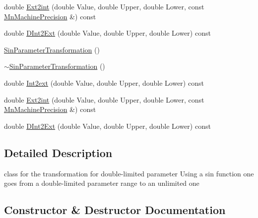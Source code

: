 \begin{DoxyCompactItemize}
\item 
double \mbox{\hyperlink{classROOT_1_1Minuit2_1_1SinParameterTransformation_a5a98af7b966742b4d3c90ab6d6bbeb5a}{Ext2int}} (double Value, double Upper, double Lower, const \mbox{\hyperlink{classROOT_1_1Minuit2_1_1MnMachinePrecision}{Mn\+Machine\+Precision}} \&) const
\item 
double \mbox{\hyperlink{classROOT_1_1Minuit2_1_1SinParameterTransformation_a4335749e9dd572c2234a8a119893e3fd}{D\+Int2\+Ext}} (double Value, double Upper, double Lower) const
\item 
\mbox{\hyperlink{classROOT_1_1Minuit2_1_1SinParameterTransformation_a54b8892f35f480210a431f1001634b9c}{Sin\+Parameter\+Transformation}} ()
\item 
\mbox{\hyperlink{classROOT_1_1Minuit2_1_1SinParameterTransformation_a5e6632c4e6006393041a63031b64f823}{$\sim$\+Sin\+Parameter\+Transformation}} ()
\item 
double \mbox{\hyperlink{classROOT_1_1Minuit2_1_1SinParameterTransformation_a53590482bc5734d9f079c8c5054d3de6}{Int2ext}} (double Value, double Upper, double Lower) const
\item 
double \mbox{\hyperlink{classROOT_1_1Minuit2_1_1SinParameterTransformation_a5a98af7b966742b4d3c90ab6d6bbeb5a}{Ext2int}} (double Value, double Upper, double Lower, const \mbox{\hyperlink{classROOT_1_1Minuit2_1_1MnMachinePrecision}{Mn\+Machine\+Precision}} \&) const
\item 
double \mbox{\hyperlink{classROOT_1_1Minuit2_1_1SinParameterTransformation_a4335749e9dd572c2234a8a119893e3fd}{D\+Int2\+Ext}} (double Value, double Upper, double Lower) const
\end{DoxyCompactItemize}


\subsection{Detailed Description}
class for the transformation for double-\/limited parameter Using a sin function one goes from a double-\/limited parameter range to an unlimited one 

\subsection{Constructor \& Destructor Documentation}
\mbox{\label{classROOT_1_1Minuit2_1_1SinParameterTransformation_a54b8892f35f480210a431f1001634b9c}} 
